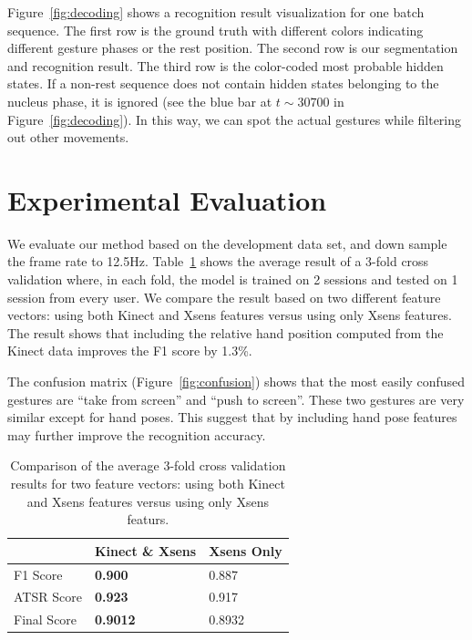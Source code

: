 \documentclass{acm_proc_article-sp}
\begin{document}
Figure~\ref{fig:decoding} shows a recognition result visualization for one batch sequence. The first
row is the ground truth with different colors indicating different gesture phases or the rest position. 
The second row is our segmentation and recognition result.
The third row is the color-coded most probable hidden states. If a non-rest sequence does not contain hidden states belonging to the nucleus phase, 
it is ignored (see the blue bar at $t\sim 30700$ in Figure~\ref{fig:decoding}). In
this way, we can spot the actual gestures while filtering out other movements.

\pagebreak
\section{Experimental Evaluation}\label{sec:eval}
We evaluate our method based on the development data set, and down sample the frame rate
to 12.5Hz.
Table~\ref{tab:comp-feature} shows the average result of a 3-fold cross validation where, in each fold,
the model is trained on 2 sessions and tested on 1 session from every user. We compare
the result based on two different feature vectors: using both Kinect and Xsens features versus using
only Xsens features. The result shows that including the relative hand position computed from 
the Kinect data improves the F1 score by 1.3\%. 

The confusion matrix (Figure~\ref{fig:confusion}) shows that the most easily confused gestures
are ``take from screen'' and ``push to screen''. These two gestures are very similar except for hand
poses. This suggest that by including hand pose features may further improve
the recognition accuracy.

\begin{table}[tb]
\begin{center}
\begin{tabular}{|l|l|l|}
\hline
 & Kinect \& Xsens & Xsens Only \\
\hline
F1 Score & \textbf{0.900} & 0.887 \\
\hline
ATSR Score & \textbf{0.923} & 0.917 \\
\hline
Final Score & \textbf{0.9012} & 0.8932 \\
\hline
\end{tabular}
\caption{Comparison of the average 3-fold cross validation results for two feature vectors:
using both Kinect and Xsens features versus using only Xsens featurs. }
\label{tab:comp-feature}
\end{center}
\end{table}
\end{document}
